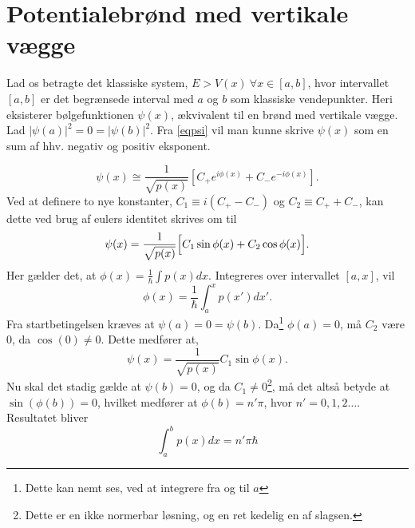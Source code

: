 \section{Potentialebrønd med vertikale vægge}
Lad os betragte det klassiske system, $E > V(x) \ \forall x \in[a,b]$, hvor intervallet $[a,b]$ er det begrænsede interval med $a$ og $b$ som klassiske vendepunkter. Heri eksisterer bølgefunktionen $\psi(x)$, ækvivalent til en brønd med vertikale vægge. Lad $|\psi(a)|^{2} = 0 = |\psi(b)|^{2}$. Fra \cref{eqpsi} vil man kunne skrive $\psi(x)$ som en sum af hhv. negativ og positiv eksponent.

\begin{equation}
    \psi(x) \cong \frac{1}{\sqrt{p(x)}}\left[C_{+}e^{i\phi(x)}+C_{-}e^{-i\phi(x)}\right].
  \label{eq:kvantiseringStart}
\end{equation}
Ved at definere to nye konstanter, $C_1 \equiv i(C_{+}-C_{-})$ og $C_2 \equiv C_{+}+C_{-}$, kan dette ved brug af eulers identitet skrives om til
\begin{equation}
  \psi(x) = \frac{1}{\sqrt{p(x)}}
  \Bigl[    C_1\sin{\phi(x)} + C_2\cos{\phi(x)}   \Bigr].
  \label{eq:kvantiseringSinCos}
\end{equation}
Her gælder det, at $\phi(x) = \frac{1}{\hbar}\int p(x) dx$. Integreres over intervallet $[a, x]$, vil
\begin{equation}
  \phi(x) = \frac{1}{\hbar}\int_{a}^{x} p(x')dx'.
\end{equation}
Fra startbetingelsen kræves at $\psi(a) = 0 = \psi(b)$. Da\footnote{Dette kan nemt ses, ved at integrere fra og til $a$} $\phi(a) = 0$, må $C_2$ være 0, da $\cos(0)\neq 0$. Dette medfører at,
\begin{equation}
    \psi(x) = \frac{1}{\sqrt{p(x)}}C_1\sin{\phi(x)}.
\end{equation}
Nu skal det stadig gælde at $\psi(b) = 0$, og da $C_1\neq 0$\footnote{Dette er en ikke normerbar løsning, og en ret kedelig en af slagsen.}, må det altså betyde at $\sin(\phi(b)) = 0$, hvilket medfører at $\phi(b) = n'\pi$, hvor $n' = 0, 1, 2\ldots$.
Resultatet bliver
\begin{equation}
  \int_{a}^{b} p(x) dx = n'\pi\hbar
  \label{eq:kvantiDone}
\end{equation}
